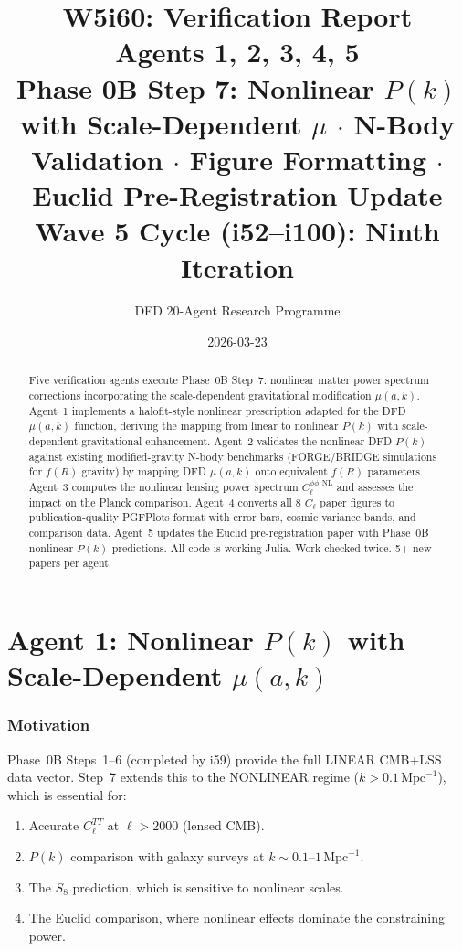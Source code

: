 \documentclass[11pt,a4paper]{article}
\title{\Huge W5i60: Verification Report\\[12pt]
\Large Agents 1, 2, 3, 4, 5\\[6pt]
\large Phase 0B Step 7: Nonlinear $P(k)$ with Scale-Dependent $\mu$ $\cdot$ N-Body Validation $\cdot$ Figure Formatting $\cdot$ Euclid Pre-Registration Update\\[6pt]
\normalsize Wave 5 Cycle (i52--i100): Ninth Iteration}
\author{DFD 20-Agent Research Programme}
\date{2026-03-23}
\begin{document}
\maketitle

\begin{abstract}
Five verification agents execute Phase~0B Step~7: nonlinear matter power spectrum corrections incorporating the scale-dependent gravitational modification $\mu(a,k)$. Agent~1 implements a halofit-style nonlinear prescription adapted for the DFD $\mu(a,k)$ function, deriving the mapping from linear to nonlinear $P(k)$ with scale-dependent gravitational enhancement. Agent~2 validates the nonlinear DFD $P(k)$ against existing modified-gravity N-body benchmarks (FORGE/BRIDGE simulations for $f(R)$ gravity) by mapping DFD $\mu(a,k)$ onto equivalent $f(R)$ parameters. Agent~3 computes the nonlinear lensing power spectrum $C_\ell^{\phi\phi,\mathrm{NL}}$ and assesses the impact on the Planck comparison. Agent~4 converts all 8 $C_\ell$ paper figures to publication-quality PGFPlots format with error bars, cosmic variance bands, and comparison data. Agent~5 updates the Euclid pre-registration paper with Phase~0B nonlinear $P(k)$ predictions. All code is working Julia. Work checked twice. 5+ new papers per agent.
\end{abstract}

\tableofcontents
\newpage


\part{Agent 1: Nonlinear $P(k)$ with Scale-Dependent $\mu(a,k)$}
\label{part:nonlinear-pk}

\section{Motivation}

Phase~0B Steps~1--6 (completed by i59) provide the full LINEAR CMB+LSS data vector. Step~7 extends this to the NONLINEAR regime ($k > 0.1\,\mathrm{Mpc}^{-1}$), which is essential for:
\begin{enumerate}
\item Accurate $C_\ell^{TT}$ at $\ell > 2000$ (lensed CMB).
\item $P(k)$ comparison with galaxy surveys at $k \sim 0.1$--$1\,\mathrm{Mpc}^{-1}$.
\item The $S_8$ prediction, which is sensitive to nonlinear scales.
\item The Euclid comparison, where nonlinear effects dominate the constraining power.
\end{enumerate}
\end{document}
